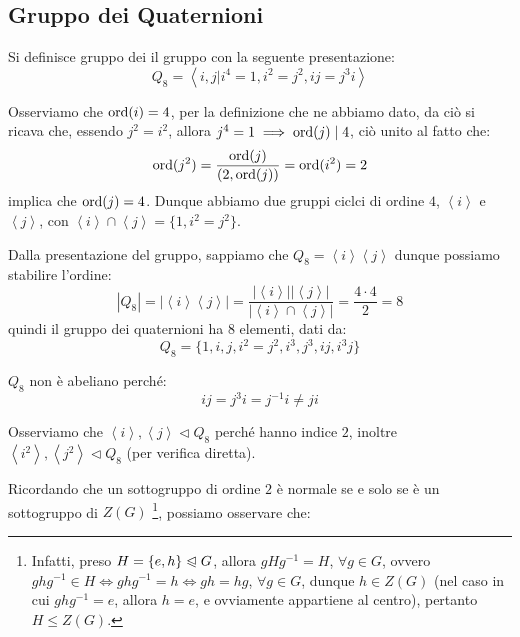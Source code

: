 \documentclass[11pt]{scrartcl}
\begin{document}
\newpage
\subsection{Gruppo dei Quaternioni}

\begin{definition}
    Si definisce gruppo dei  il gruppo con la seguente presentazione:
        \[ Q_8 = \left<i,j | i^4 = 1, i^2 = j^2, ij = j^3i\right>
            \]
\end{definition}

\begin{remark}[Ordini di $i$ e $j$]
    Osserviamo che $\operatorname{ord}(i) = 4$, per la definizione che ne abbiamo dato, da ciò si ricava che, essendo $j^2 = i^2$,
    allora $j^4 = 1 \implies \operatorname{ord}(j) \mid 4$, ciò unito al fatto che:
        \[ \operatorname{ord}(j^2) = \frac{\operatorname{ord}(j)}{(2,\operatorname{ord}(j))} = \operatorname{ord}(i^2) = 2
            \]
    implica che $\operatorname{ord}(j) = 4$. Dunque abbiamo due gruppi ciclci di ordine $4$, $\left<i\right>$ e $\left<j\right>$, con
    $\left<i\right> \cap \left<j\right> = \{1,i^2 = j^2\}$.
\end{remark}

Dalla presentazione del gruppo, sappiamo che $Q_8 = \left<i\right>\left<j\right>$ dunque possiamo stabilire l'ordine:
    \[ |Q_8| = |\left<i\right>\left<j\right>| = \frac{|\left<i\right>||\left<j\right>|}{|\left<i\right> \cap \left<j\right>|} = \frac{4 \cdot 4 }{2} = 8
        \]
quindi il gruppo dei quaternioni ha $8$ elementi, dati da:
    \[ Q_8 = \{1, i, j, i^2 = j^2, i^3, j^3, ij, i^3j\}
        \]

\begin{remark}
    $Q_8$ non è abeliano perché:
        \[ ij = j^3i = j^{-1}i \ne ji
            \]
\end{remark}

\begin{remark}
    Osserviamo che $\left<i\right>,\left<j\right> \triangleleft Q_8$ perché hanno indice $2$, inoltre $\left<i^2\right>, \left<j^2\right> \triangleleft Q_8$ (per verifica diretta). 
\end{remark}

Ricordando che un sottogruppo di ordine $2$ è normale se e solo se è un sottogruppo di $Z(G)$ \footnote{Infatti, preso $H = \{e,h\} \trianglelefteqslant G$, allora $gHg^{-1} = H$, $\forall g \in G$, ovvero $ghg^{-1} \in H \iff ghg^{-1} = h \iff
gh = hg$, $\forall g \in G$, dunque $h \in Z(G)$ (nel caso in cui $ghg^{-1} = e$, allora $h = e$, e ovviamente appartiene al centro), pertanto $H \leqslant Z(G)$.}, possiamo osservare che:
\end{document}
